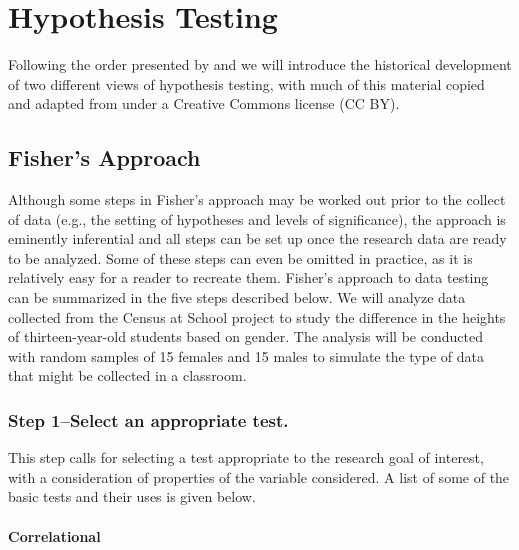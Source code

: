 \documentclass[
]{book}
\let\stdsection\section
\renewcommand\section{\newpage\stdsection}
\theoremstyle{definition}
\theoremstyle{definition}
\theoremstyle{definition}
\theoremstyle{definition}
\theoremstyle{remark}
\begin{document}
\hypertarget{hypothesis-testing}{%
\section{Hypothesis Testing}\label{hypothesis-testing}}

Following the order presented by \citet{Macdonald1997} and \citet{Perezgonzalez2015} we will introduce the historical development of two different views of hypothesis testing, with much of this material copied and adapted from \citet{Perezgonzalez2015} under a Creative Commons license (CC BY).

\hypertarget{fishers-approach}{%
\subsection{Fisher's Approach}\label{fishers-approach}}

Although some steps in Fisher's approach may be worked out prior to the collect of data (e.g., the setting of hypotheses and levels of significance), the approach is eminently inferential and all steps can be set up once the research data are ready to be analyzed. Some of these steps can even be omitted in practice, as it is relatively easy for a reader to recreate them. Fisher's approach to data testing can be summarized in the five steps described below. We will analyze data collected from the Census at School project to study the difference in the heights of thirteen-year-old students based on gender. The analysis will be conducted with random samples of 15 females and 15 males to simulate the type of data that might be collected in a classroom.

\hypertarget{step-1select-an-appropriate-test.}{%
\subsubsection*{Step 1--Select an appropriate test.}\label{step-1select-an-appropriate-test.}}

This step calls for selecting a test appropriate to the research goal of interest, with a consideration of properties of the variable considered. A list of some of the basic tests and their uses is given below.

\hypertarget{correlational}{%
\paragraph*{Correlational}\label{correlational}}
\end{document}
